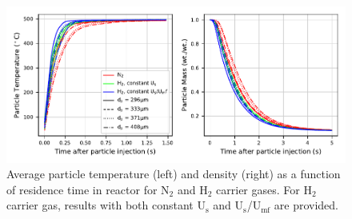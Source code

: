 \documentclass{article}
\begin{document}
\begin{figure}[H]
    \centering
    \includegraphics[width=\textwidth]{figures/cfd-constuumf-particle-temp-density.pdf}
    \caption{Average particle temperature (left) and density (right) as a function of residence time in reactor for N$_2$ and H$_2$ carrier gases. For H$_2$ carrier gas, results with both constant U$_\text{s}$ and U$_\text{s}$/U$_\text{mf}$ are provided.}
    \label{fig:cfd-constuumf-particle-temp-density}
\end{figure}
\end{document}
